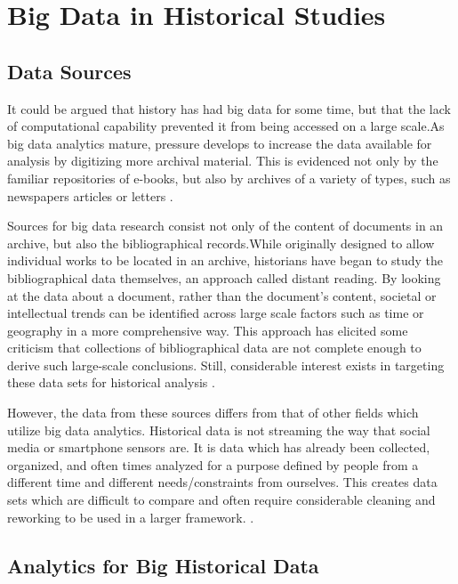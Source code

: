 \documentclass[sigconf]{acmart}
\begin{document}
\section{Big Data in Historical Studies}

\subsection{Data Sources}

It could be argued that history has had big data for some time, but that the lack of computational capability prevented it from being accessed on a large scale.As big data analytics mature, pressure develops to increase the data available for analysis by digitizing more archival material. This is evidenced not only by the familiar repositories of e-books, but also by archives of a variety of types, such as newspapers articles \cite{bdglobalhist} or letters \cite{digitalrepublicletters}.

Sources for big data research consist not only of the content of documents in an archive, but also the bibliographical records.While originally designed to allow individual works to be located in an archive, historians have began to study the bibliographical data themselves, an approach called distant reading. By looking at the data about a document, rather than the document's content, societal or intellectual trends can be identified across large scale factors such as time or geography in a more comprehensive way. This approach has elicited some criticism that collections of bibliographical data are not complete enough to derive such large-scale conclusions. Still, considerable interest exists in targeting these data sets for historical analysis \cite{musichist}.

However, the data from these sources differs from that of other fields which utilize big data analytics. Historical data is not streaming the way that social media or smartphone sensors are. It is data which has already been collected, organized, and often times analyzed for a purpose defined by people from a different time and different needs/constraints from ourselves. This creates data sets which are difficult to compare and often require considerable cleaning and reworking to be used in a larger framework. \cite{digitalrepublicletters}.

\subsection{Analytics for Big Historical Data}
\end{document}
